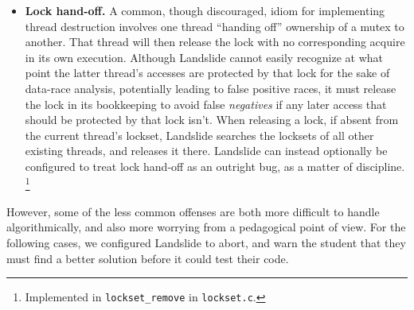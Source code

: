 \begin{itemize}
		When a deadlock arises under conditions where one or more threads are heuristically blocked,
		Landslide attempts to refute it as a false positive by artificially unblocking all heuristically-blocked threads%
		\footnote{If any threads are ICB-blocked, I prioritize waking those before trying to wake any yield-blocked threads.
		Waking all threads at once here can lead to unsoundness.}
		If the deadlock is true, each thread will immediately trigger the yield-blocking heuristic again,
		bringing the system back into deadlocked state.
		Landslide then repeats this process a heuristic constant number of times (128),
		allowing the program that many chances to make progress before proclaiming deadlock.
		(Note that this heuristic cannot miss true deadlocks as false negatives.)
		\footnote{Implemented in {\tt try\_avoid\_fp\_deadlock} in {\tt arbiter.c}.}
	\item {\bf Lock hand-off.}
		A common, though discouraged, idiom for implementing thread destruction involves one thread ``handing off'' ownership of a mutex to another.
		That thread will then release the lock with no corresponding acquire in its own execution.
		Although Landslide cannot easily recognize at what point the latter thread's accesses are protected by that lock for the sake of data-race analysis,
		potentially leading to false positive races,
		it must release the lock in its bookkeeping to avoid false {\em negatives} if any later access that should be protected by that lock isn't.
		When releasing a lock, if absent from the current thread's lockset, Landslide searches the locksets of all other existing threads, and releases it there.
		Landslide can instead optionally be configured to treat lock hand-off as an outright bug, as a matter of discipline.
		\footnote{Implemented in {\tt lockset\_remove} in {\tt lockset.c}.}

\end{itemize}

However, some of the less common offenses are both more difficult to handle algorithmically, and also more worrying from a pedagogical point of view.
For the following cases, we configured Landslide to abort, and warn the student that they must find a better solution before it could test their code.

